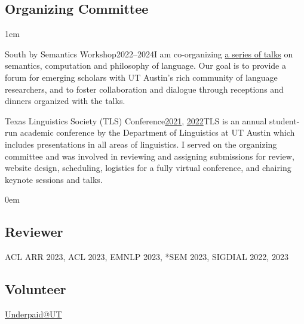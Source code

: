 \subsection{Organizing Committee}

\leftskip1em\relax

\smallentry
  {\large South by Semantics Workshop}{2022--2024}{I am co-organizing \href{https://sites.utexas.edu/sxsemantics/}{a series of talks} on semantics, computation and philosophy of language. Our goal is to provide a forum for emerging scholars with UT Austin's rich community of language researchers, and to foster collaboration and dialogue through receptions and dinners organized with the talks.}
  
\smallentry
    {\large Texas Linguistics Society (TLS) Conference}{\href{http://tls.ling.utexas.edu/2021/}{2021}, \href{http://tls.ling.utexas.edu/2022/}{2022}}{TLS is an annual student-run academic conference by the Department of Linguistics at UT Austin which includes presentations in all areas of linguistics. I served on the organizing committee and was involved in reviewing and assigning submissions for review, website design, scheduling, logistics for a fully virtual conference, and chairing keynote sessions and talks.}

\leftskip0em\relax

\subsection{Reviewer}

\quad ACL ARR 2023, ACL 2023, EMNLP 2023, *SEM 2023, SIGDIAL 2022, 2023

\subsection{Volunteer}

\quad \href{http://underpaidatut.org}{Underpaid\makeatletter @\makeatother UT}
